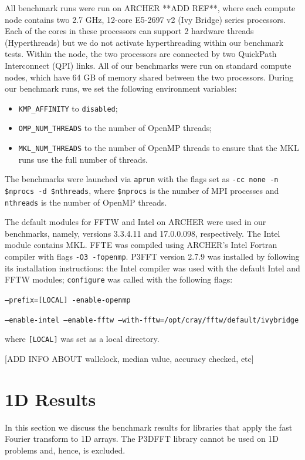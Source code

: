 \documentclass[a4]{article}
\begin{document}
All benchmark runs were run on ARCHER **ADD REF**, where each compute node 
contains two 
2.7 GHz, 12-core E5-2697 v2 (Ivy Bridge) series processors. Each of the cores 
in these processors can support 2 hardware threads (Hyperthreads) but we do 
not activate hyperthreading within our benchmark tests. Within the node, the 
two processors are connected by two QuickPath Interconnect (QPI) links. All of 
our benchmarks were run on standard compute nodes, which have 64 GB of memory 
shared between the two processors. During our benchmark runs, we set the following environment variables:
\begin{itemize}
\item \texttt{KMP\_AFFINITY} to \texttt{disabled};
\item \texttt{OMP\_NUM\_THREADS} to the number of OpenMP threads;
\item \texttt{MKL\_NUM\_THREADS} to the number of OpenMP threads to ensure that the MKL runs use the full number of threads.
\end{itemize}
The benchmarks were launched via \texttt{aprun} with the flags set as 
\texttt{-cc none -n \$nprocs -d \$nthreads}, where \texttt{\$nprocs} is the 
number of MPI processes and \texttt{nthreads} is the number of OpenMP threads.

The default modules for  FFTW and Intel on ARCHER were used in our benchmarks, 
namely, versions 3.3.4.11 and 17.0.0.098, respectively. The Intel module 
contains MKL. FFTE was compiled using ARCHER's Intel Fortran compiler with flags \texttt{-O3 -fopenmp}. P3FFT version 2.7.9 was installed by following its installation instructions: the Intel compiler was used with the default Intel and FFTW modules; \texttt{configure} was called with the following flags:

\noindent \texttt{--prefix=[LOCAL] -enable-openmp}

\noindent \texttt{--enable-intel --enable-fftw --with-fftw=/opt/cray/fftw/default/ivybridge}

\noindent where \texttt{[LOCAL]} was set as a local directory.

[ADD INFO ABOUT wallclock, median value, accuracy checked, etc]


\section{1D Results}


In this section we discuss the benchmark results for libraries that apply the 
fast Fourier transform to 1D arrays.  The P3DFFT library cannot be used on 1D 
problems and, hence, is excluded.
\end{document}

